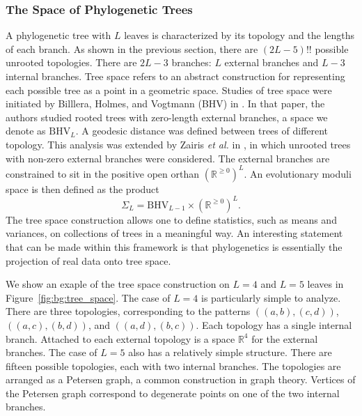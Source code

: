 \subsubsection{The Space of Phylogenetic Trees}
\label{bg:bio:phylo:space}

A phylogenetic tree with $L$ leaves is characterized by its topology and the lengths of each branch.
As shown in the previous section, there are $(2L-5)!!$ possible unrooted topologies.
There are $2L-3$ branches: $L$ external branches and $L-3$ internal branches.
Tree space refers to an abstract construction for representing each possible tree as a point in a geometric space.
Studies of tree space were initiated by Billlera, Holmes, and Vogtmann (BHV) in \cite{Billera:2001tv}.
In that paper, the authors studied rooted trees with zero-length external branches, a space we denote as $\mathrm{BHV}_{L}$.
A geodesic distance was defined between trees of different topology.
This analysis was extended by Zairis \emph{et al.} in \cite{Zairis:2014wa}, in which unrooted trees with non-zero external branches were considered.
The external branches are constrained to sit in the positive open orthan $(\mathbb{R}^{\geq 0})^{L}$.
An evolutionary moduli space is then defined as the product
\begin{equation}
\Sigma_{L} = \mathrm{BHV}_{L-1} \times (\mathbb{R}^{\geq 0})^{L}.
\end{equation}
The tree space construction allows one to define statistics, such as means and variances, on collections of trees in a meaningful way.
An interesting statement that can be made within this framework is that phylogenetics is essentially the projection of real data onto tree space.

We show an exaple of the tree space construction on $L=4$ and $L=5$ leaves in Figure~\ref{fig:bg:tree_space}.
The case of $L=4$ is particularly simple to analyze.
There are three topologies, corresponding to the patterns $((a,b),(c,d))$, $((a,c),(b,d))$, and $((a,d),(b,c))$.
Each topology has a single internal branch.
Attached to each external topology is a space $\mathbb{R}^4$ for the external branches.
The case of $L=5$ also has a relatively simple structure.
There are fifteen possible topologies, each with two internal branches.
The topologies are arranged as a Petersen graph, a common construction in graph theory.
Vertices of the Petersen graph correspond to degenerate points on one of the two internal branches.

